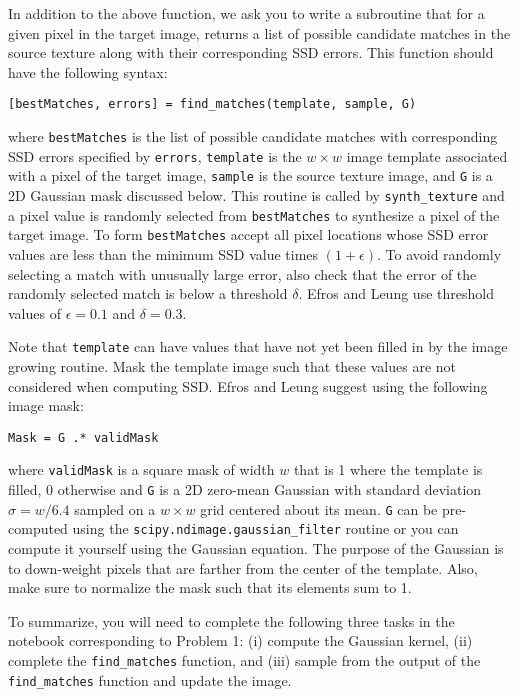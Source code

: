 \documentclass[11pt]{article}
\begin{document}
In addition to the above function, we ask you to write a subroutine that for a given pixel in the target image, returns a list of possible candidate matches in the source texture along with their corresponding SSD errors. This function should have the following syntax:
\vspace{-0.1in}
\begin{center}\texttt{[bestMatches, errors] = find\_matches(template, sample, G)}\end{center}
\vspace{-0.1in}
where \texttt{bestMatches} is the list of possible candidate matches with corresponding
SSD errors specified by \texttt{errors}, \texttt{template} is the $w \times w$ image template associated
with a pixel of the target image, \texttt{sample} is the source texture image, and \texttt{G} is a
2D Gaussian mask discussed below. This routine is called by \texttt{synth\_texture} and
a pixel value is randomly selected from \texttt{bestMatches} to synthesize a pixel of the
target image. To form \texttt{bestMatches} accept all pixel locations whose SSD error
values are less than the minimum SSD value times $(1+\epsilon)$. To avoid randomly
selecting a match with unusually large error, also check that the error of the
randomly selected match is below a threshold $\delta$. Efros and Leung use threshold
values of $\epsilon = 0.1$ and $\delta = 0.3$.

Note that \texttt{template} can have values that have not yet been filled in by the image
growing routine. Mask the template image such that these values are not
considered when computing SSD. Efros and Leung suggest using the following
image mask:
\vspace{-0.1in}
\begin{center}\texttt{Mask = G .* validMask}\end{center}
\vspace{-0.1in}
where \texttt{validMask} is a square mask of width $w$ that is 1 where the template is filled, 0 otherwise and \texttt{G} is a 2D zero-mean Gaussian with standard deviation $\sigma = w/6.4$ sampled on a $w \times w$ grid centered about its mean. \texttt{G} can be pre-computed using the \texttt{scipy.ndimage.gaussian\_filter} routine or you can compute it yourself using the Gaussian equation. The purpose of the Gaussian is to down-weight pixels that are farther from the center of the template. Also, make sure to normalize the mask such that its elements sum to 1.

To summarize, you will need to complete the following three tasks in the notebook corresponding to Problem 1: (i) compute the Gaussian kernel, (ii) complete the \texttt{find\_matches} function, and (iii) sample from the output of the \texttt{find\_matches} function and update the image.
\end{document}
